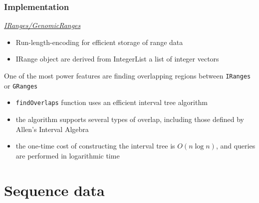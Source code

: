 \documentclass{beamer}\usepackage[]{graphicx}\usepackage[]{color}
\newcommand{\Rpackage}[1]{{\usebeamercolor[fg]{structure} \textsl{#1}}}
\newcommand\Biocpkg[1]{%
  {\href{http://bioconductor.org/packages/release/bioc/html/#1.html}%
    {\Rpackage{#1}}}}
\newcommand{\Rcode}[1]{\texttt{#1}}
\newcommand{\Rfunction}[1]{\Rcode{#1}}
\newcommand{\Robject}[1]{\Rcode{#1}}
\begin{document}
\begin{frame}
  \frametitle{Implementation}
  \Biocpkg{IRanges/GenomicRanges}
  \begin{itemize}
  \item Run-length-encoding for efficient storage of range data
  \item IRange object are derived from IntegerList a list of integer vectors
  \end{itemize}
  One of the most power features are finding overlapping regions between \Robject{IRanges} or \Robject{GRanges}
  \begin{itemize}
  \item \Rfunction{findOverlaps} function uses an efficient interval tree algorithm
  \item the algorithm supports several types of overlap, including those defined by Allen's Interval Algebra
  \item the one-time cost of constructing the interval tree is $O(n\log n)$, and queries are performed in logarithmic time
  \end{itemize}
\end{frame}

\section{Sequence data}
\end{document}
